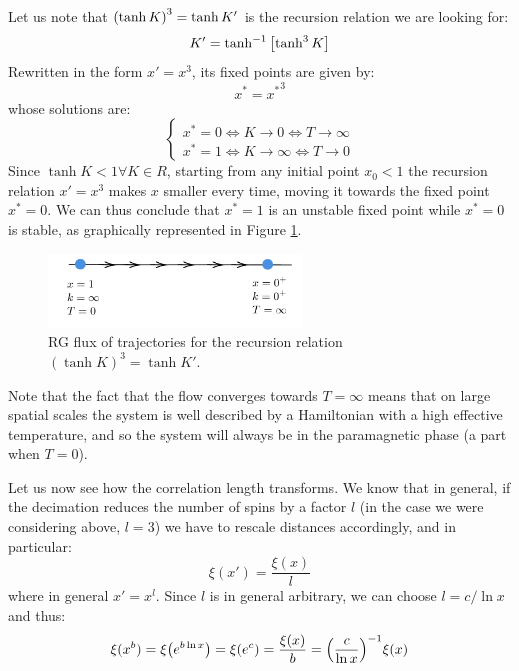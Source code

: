 \documentclass[../main/main.tex]{subfiles}
\begin{document}
Let us note that \( \qty(\tanh K)^3 = \tanh K'  \) is the recursion relation we are looking for:
\begin{equation}
  K'= \tanh^{-1} \qty[ \tanh^3 K]
\end{equation}
Rewritten in the form \( x' = x^3 \), its fixed points are given by:
\begin{equation*}
  x^* = {x^*}^3
\end{equation*}
whose solutions are:
\begin{equation}
  \begin{cases}
   x^* = 0 \iff K \rightarrow 0 \iff T \rightarrow \infty \\
   x^* = 1 \iff K \rightarrow \infty  \iff T \rightarrow 0
  \end{cases}
\end{equation}
Since \( \tanh K < 1 \forall K \in R \), starting from any initial point  \( x_0 < 1 \) the recursion relation \(  x' = x^3 \) makes \( x \) smaller every time, moving it towards the fixed point \( x^*=0 \). We can thus conclude that \( x^*=1 \) is an unstable fixed point while \( x^*=0 \) is stable, as graphically represented in Figure \ref{fig:20_3}.

\begin{figure}[h!]
\centering
\includegraphics[width=0.6\textwidth]{../lessons/20_image/3.pdf}
\caption{\label{fig:20_3} RG flux of trajectories for the recursion relation \( (\tanh K)^{3}=\tanh K' \).}
\end{figure}

Note that the fact that the flow converges towards \( T = \infty  \)  means that on large spatial scales the system is well described by a Hamiltonian with a high effective temperature, and so the system will always be in the paramagnetic phase (a part when \( T=0 \)).

Let us now see how the correlation length transforms. We know that in general, if the decimation reduces the number of spins by a factor \( l \) (in the case we were considering above, \( l=3 \)) we have to rescale distances accordingly, and in particular:
\begin{equation*}
  \xi (x') = \frac{\xi (x)}{l}
\end{equation*}
where in general \(  x' = x^l \).
Since \( l \) is in general arbitrary, we can choose \( l = c / \ln{x} \)  and thus:
\begin{equation}
  \xi (x^b) = \xi  \qty(e ^{b \ln{x} }) = \xi (e^c) = \frac{\xi (x)}{b}
  = \qty(\frac{c}{\ln{x} })^{-1} \xi (x)
\end{equation}
\end{document}
